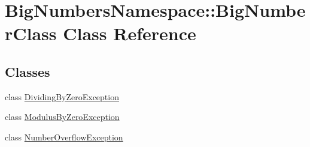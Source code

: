 \hypertarget{class_big_numbers_namespace_1_1_big_number_class}{}\section{Big\+Numbers\+Namespace\+:\+:Big\+Number\+Class Class Reference}
\label{class_big_numbers_namespace_1_1_big_number_class}
\subsection*{Classes}
\begin{DoxyCompactItemize}
\item 
class \mbox{\hyperlink{class_big_numbers_namespace_1_1_big_number_class_1_1_dividing_by_zero_exception}{Dividing\+By\+Zero\+Exception}}
\item 
class \mbox{\hyperlink{class_big_numbers_namespace_1_1_big_number_class_1_1_modulus_by_zero_exception}{Modulus\+By\+Zero\+Exception}}
\item 
class \mbox{\hyperlink{class_big_numbers_namespace_1_1_big_number_class_1_1_number_overflow_exception}{Number\+Overflow\+Exception}}
\end{DoxyCompactItemize}
